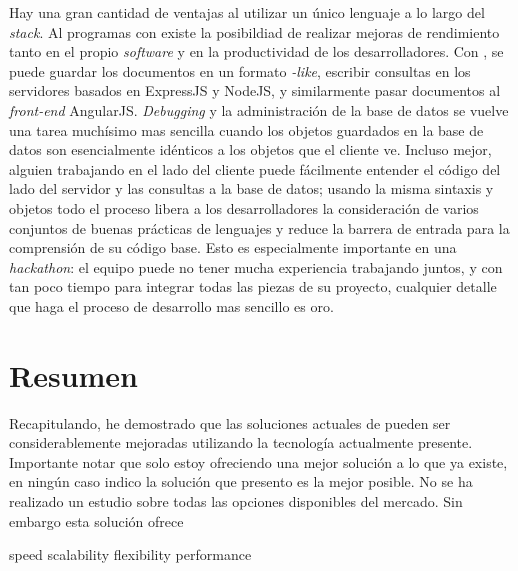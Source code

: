 Hay una gran cantidad de ventajas al utilizar un único lenguaje a lo largo del \textit{stack}. Al programas con  existe la posibildiad de realizar mejoras de rendimiento tanto en el propio \textit{software} y en la productividad de los desarrolladores. Con , se puede guardar los documentos en un formato \textit{-like}, escribir consultas  en los servidores basados en ExpressJS y NodeJS, y similarmente pasar documentos  al \textit{front-end} AngularJS. \textit{Debugging} y la administración de la base de datos se vuelve una tarea muchísimo mas sencilla cuando los objetos guardados en la base de datos son esencialmente idénticos a los objetos que el cliente  ve. Incluso mejor, alguien trabajando en el lado del cliente puede fácilmente entender el código del lado del servidor y las consultas a la base de datos; usando la misma sintaxis y objetos todo el proceso libera a los desarrolladores la consideración de varios conjuntos de buenas prácticas de lenguajes y reduce la barrera de entrada para la comprensión de su código base. Esto es especialmente importante en una \textit{hackathon}: el equipo puede no tener mucha experiencia trabajando juntos, y con tan poco tiempo para integrar todas las piezas de su proyecto, cualquier detalle que haga el proceso de desarrollo mas sencillo es oro.


\section{Resumen}
Recapitulando, he demostrado que las soluciones actuales de  pueden ser considerablemente mejoradas utilizando la tecnología actualmente presente. 
Importante notar que solo estoy ofreciendo una mejor solución a lo que ya existe, en ningún caso indico la solución que presento es la mejor posible. No se ha realizado un estudio sobre todas las opciones disponibles del mercado. Sin embargo esta solución ofrece

speed
scalability
flexibility
performance
